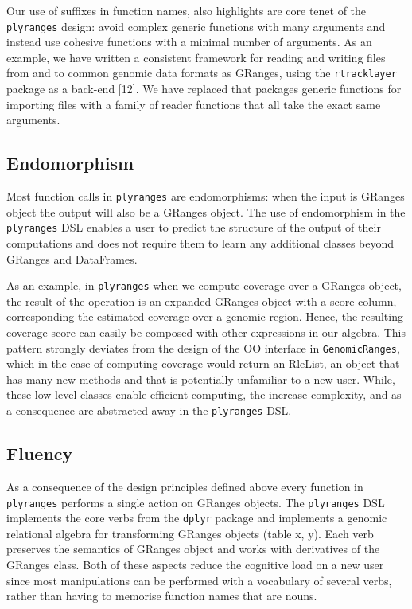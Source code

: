 \documentclass[10pt,letterpaper]{article}
\begin{document}
Our use of suffixes in function names, also highlights are core tenet of
the \texttt{plyranges} design: avoid complex generic functions with many
arguments and instead use cohesive functions with a minimal number of
arguments. As an example, we have written a consistent framework for
reading and writing files from and to common genomic data formats as
GRanges, using the \texttt{rtracklayer} package as a back-end {[}12{]}.
We have replaced that packages generic functions for importing files
with a family of reader functions that all take the exact same
arguments.

\hypertarget{endomorphism}{%
\subsection{Endomorphism}\label{endomorphism}}

Most function calls in \texttt{plyranges} are endomorphisms: when the
input is GRanges object the output will also be a GRanges object. The
use of endomorphism in the \texttt{plyranges} DSL enables a user to
predict the structure of the output of their computations and does not
require them to learn any additional classes beyond GRanges and
DataFrames.

As an example, in \texttt{plyranges} when we compute coverage over a
GRanges object, the result of the operation is an expanded GRanges
object with a score column, corresponding the estimated coverage over a
genomic region. Hence, the resulting coverage score can easily be
composed with other expressions in our algebra. This pattern strongly
deviates from the design of the OO interface in \texttt{GenomicRanges},
which in the case of computing coverage would return an RleList, an
object that has many new methods and that is potentially unfamiliar to a
new user. While, these low-level classes enable efficient computing, the
increase complexity, and as a consequence are abstracted away in the
\texttt{plyranges} DSL.

\hypertarget{fluency}{%
\subsection{Fluency}\label{fluency}}

As a consequence of the design principles defined above every function
in \texttt{plyranges} performs a single action on GRanges objects. The
\texttt{plyranges} DSL implements the core verbs from the \texttt{dplyr}
package and implements a genomic relational algebra for transforming
GRanges objects (table x, y). Each verb preserves the semantics of
GRanges object and works with derivatives of the GRanges class. Both of
these aspects reduce the cognitive load on a new user since most
manipulations can be performed with a vocabulary of several verbs,
rather than having to memorise function names that are nouns.
\end{document}
